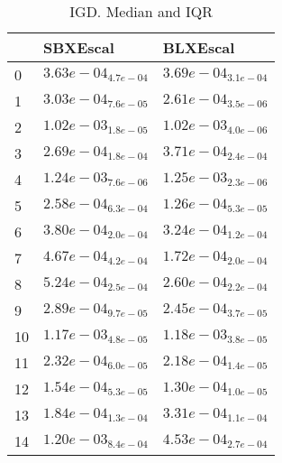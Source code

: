 \documentclass{article}
\begin{document}
\begin{table}
\caption{IGD. Median and IQR}
\label{table:median.IGD}
\begin{scriptsize}
\centering
\begin{tabular}{lll}
\hline & SBXEscal &  BLXEscal\\
\hline
0 & \cellcolor{gray95}$  3.63e-04_{ 4.7e-04}$ & $  3.69e-04_{ 3.1e-04}$ \\
1 & \cellcolor{gray25}$  3.03e-04_{ 7.6e-05}$ & \cellcolor{gray95}$  2.61e-04_{ 3.5e-06}$ \\
2 & \cellcolor{gray95}$  1.02e-03_{ 1.8e-05}$ & $  1.02e-03_{ 4.0e-06}$ \\
3 & \cellcolor{gray95}$  2.69e-04_{ 1.8e-04}$ & $  3.71e-04_{ 2.4e-04}$ \\
4 & \cellcolor{gray95}$  1.24e-03_{ 7.6e-06}$ & $  1.25e-03_{ 2.3e-06}$ \\
5 & \cellcolor{gray25}$  2.58e-04_{ 6.3e-04}$ & \cellcolor{gray95}$  1.26e-04_{ 5.3e-05}$ \\
6 & \cellcolor{gray25}$  3.80e-04_{ 2.0e-04}$ & \cellcolor{gray95}$  3.24e-04_{ 1.2e-04}$ \\
7 & \cellcolor{gray25}$  4.67e-04_{ 4.2e-04}$ & \cellcolor{gray95}$  1.72e-04_{ 2.0e-04}$ \\
8 & \cellcolor{gray25}$  5.24e-04_{ 2.5e-04}$ & \cellcolor{gray95}$  2.60e-04_{ 2.2e-04}$ \\
9 & \cellcolor{gray25}$  2.89e-04_{ 9.7e-05}$ & \cellcolor{gray95}$  2.45e-04_{ 3.7e-05}$ \\
10 & \cellcolor{gray95}$  1.17e-03_{ 4.8e-05}$ & $  1.18e-03_{ 3.8e-05}$ \\
11 & \cellcolor{gray25}$  2.32e-04_{ 6.0e-05}$ & \cellcolor{gray95}$  2.18e-04_{ 1.4e-05}$ \\
12 & \cellcolor{gray25}$  1.54e-04_{ 5.3e-05}$ & \cellcolor{gray95}$  1.30e-04_{ 1.0e-05}$ \\
13 & \cellcolor{gray95}$  1.84e-04_{ 1.3e-04}$ & $  3.31e-04_{ 1.1e-04}$ \\
14 & \cellcolor{gray25}$  1.20e-03_{ 8.4e-04}$ & \cellcolor{gray95}$  4.53e-04_{ 2.7e-04}$ \\
\hline
\end{tabular}
\end{scriptsize}
\end{table}
\
\end{document}
